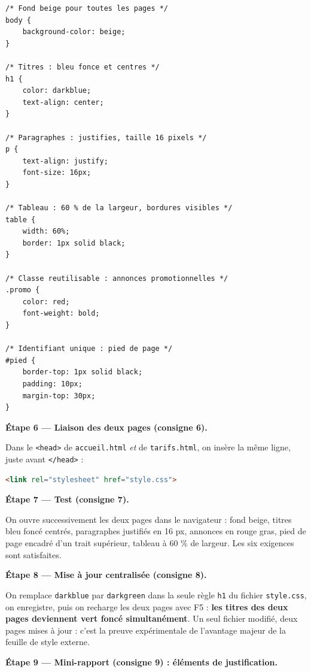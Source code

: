 \documentclass[11pt]{article}
\begin{document}
\begin{exoresolu}
\begin{lstlisting}
/* Fond beige pour toutes les pages */
body {
    background-color: beige;
}

/* Titres : bleu fonce et centres */
h1 {
    color: darkblue;
    text-align: center;
}

/* Paragraphes : justifies, taille 16 pixels */
p {
    text-align: justify;
    font-size: 16px;
}

/* Tableau : 60 % de la largeur, bordures visibles */
table {
    width: 60%;
    border: 1px solid black;
}

/* Classe reutilisable : annonces promotionnelles */
.promo {
    color: red;
    font-weight: bold;
}

/* Identifiant unique : pied de page */
#pied {
    border-top: 1px solid black;
    padding: 10px;
    margin-top: 30px;
}
\end{lstlisting}

\textbf{Étape 6 — Liaison des deux pages (consigne 6).}

Dans le \texttt{<head>} de \texttt{accueil.html} \emph{et} de \texttt{tarifs.html}, on insère la même ligne, juste avant \texttt{</head>} :

\begin{lstlisting}[language=HTML]
<link rel="stylesheet" href="style.css">
\end{lstlisting}

\textbf{Étape 7 — Test (consigne 7).}

On ouvre successivement les deux pages dans le navigateur : fond beige, titres bleu foncé centrés, paragraphes justifiés en 16 px, annonces en rouge gras, pied de page encadré d'un trait supérieur, tableau à 60 \% de largeur. Les six exigences sont satisfaites.

\textbf{Étape 8 — Mise à jour centralisée (consigne 8).}

On remplace \texttt{darkblue} par \texttt{darkgreen} dans la seule règle \texttt{h1} du fichier \texttt{style.css}, on enregistre, puis on recharge les deux pages avec F5 : \textbf{les titres des deux pages deviennent vert foncé simultanément}. Un seul fichier modifié, deux pages mises à jour : c'est la preuve expérimentale de l'avantage majeur de la feuille de style externe.

\textbf{Étape 9 — Mini-rapport (consigne 9) : éléments de justification.}


\end{exoresolu}
\end{document}
